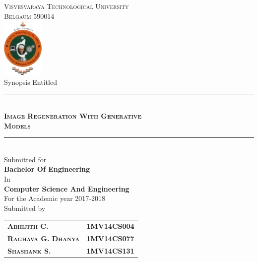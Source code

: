

\begin{titlepage} %
	\newcommand{\HRule}{\rule{\linewidth}{0.5mm}} %

	\center %

	\textsc{\LARGE Visvesvaraya Technological University\\[3pt]Belgaum 590014}\\[10pt] 
	\includegraphics[width=0.15\textwidth]{images/vtu.png}\\[10pt] 

	{\Large Synopsis Entitled}\\[10pt] %


	\HRule\\[10pt]
	\textsc{\huge \textbf{Image Regeneration With Generative}\\[3pt] \textbf{Models}}\\[10pt]

	\HRule\\[10pt]
	\Large{
		Submitted for\\
		\textbf{Bachelor Of Engineering}\\
		In \\
		\textbf{Computer Science And Engineering} \\
		For the Academic year 2017-2018 
	}\\[15pt]
	\Large{Submitted by}\\[2pt]
	\begin{tabular}{ l r }
		\textsc{\Large \textbf{Abhijith C.}}       & \Large \textbf{1MV14CS004} \\
		\textsc{\Large \textbf{Raghava G. Dhanya}} & \Large \textbf{1MV14CS077} \\
		\textsc{\Large \textbf{Shashank S.}}       & \Large \textbf{1MV14CS131}
	\end{tabular}\\[15pt]


\end{titlepage}
